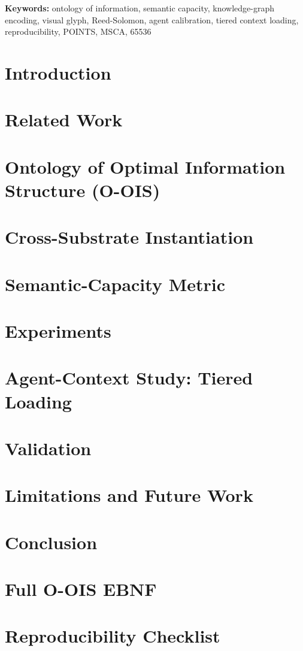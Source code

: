 \documentclass[11pt, a4paper]{article}
\newcommand{\keywords}[1]{\par\addvspace\baselineskip\noindent\textbf{Keywords:} #1}
\begin{document}
\keywords{ontology of information, semantic capacity, knowledge-graph encoding, visual glyph, Reed-Solomon, agent calibration, tiered context loading, reproducibility, POINTS, MSCA, 65536}

\section{Introduction}


\section{Related Work}


\section{Ontology of Optimal Information Structure (O-OIS)}


\section{Cross-Substrate Instantiation}


\section{Semantic-Capacity Metric}


\section{Experiments}


\section{Agent-Context Study: Tiered Loading}


\section{Validation}


\section{Limitations and Future Work}


\section{Conclusion}





\appendix
\section{Full O-OIS EBNF}
\label{app:ebnf}


\section{Reproducibility Checklist}
\label{app:repro}

\end{document}
